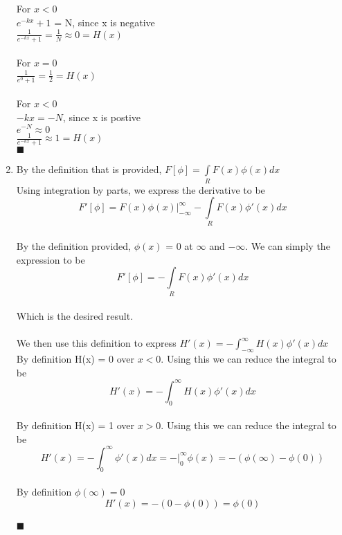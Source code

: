 \documentclass{article}
\begin{document}
\begin{enumerate}
		
		For $x < 0$\\
		$e^{-kx} + 1$ = N, since x is negative\\
		$\frac{1}{e^{-kx} + 1} = \frac{1}{N} \approx 0 = H(x)$\\ \\

		For $x = 0$\\
		$\frac{1}{e^{0} + 1} = \frac{1}{2} = H(x)$ \\ \\

		For $x < 0$\\
		$- kx= -N$, since x is postive\\
		$e^{-N}  \approx 0$\\
		$\frac{1}{e^{-kx} + 1} \approx 1 = H(x)$\\ 

	           $\blacksquare$

	\item 
		By the definition that is provided,  $F[\phi] = \int\limits_R F(x)\phi(x)d x$ \\
		Using integration by parts, we express the derivative to be \\
		$$F'[\phi]=  F(x)\phi(x) \Big|_{-\infty}^\infty -  \int\limits_R F(x)\phi'(x)d x$$ \\
		By the definition provided, $\phi(x)$ = 0 at $\infty$ and $-\infty$. We can simply the expression to be\\
		$$F'[\phi]= -  \int\limits_R F(x)\phi'(x)d x$$ \\
		Which is the desired result.\\ \\

		We then use this definition to express $ H'(x) = - \int_{-\infty}^\infty H(x)\phi'(x)d x$ \\
		By definition H(x) = 0 over $x<0$. Using this we can reduce the integral to be\\
		$$H'(x) = - \int_{0}^\infty H(x)\phi'(x)d x$$\\
		By definition H(x) = 1 over $x>0$. Using this we can reduce the integral to be\\
		$$H'(x) = - \int_{0}^\infty\phi'(x)d x = - \Big|_{0}^\infty \phi(x) = - (\phi(\infty) - \phi(0))$$\\
		By definition $ \phi(\infty) = 0$\\
		$$H'(x) =  - (0 - \phi(0)) = \phi(0)$$\\
	           $\blacksquare$		




	



    \end{enumerate}
\vspace{1cm}
\end{document}
